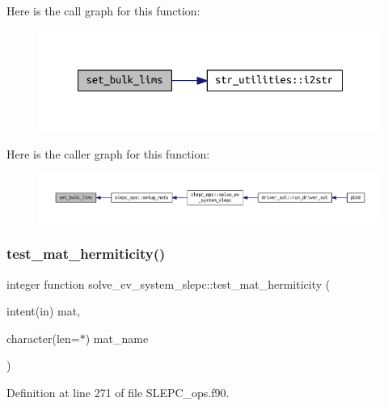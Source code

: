 Here is the call graph for this function\+:
\nopagebreak
\begin{figure}[H]
\begin{center}
\leavevmode
\includegraphics[width=348pt]{SLEPC__ops_8f90_aad0c37f65f398c2aa88ea11b21eb2006_cgraph}
\end{center}
\end{figure}
Here is the caller graph for this function\+:
\nopagebreak
\begin{figure}[H]
\begin{center}
\leavevmode
\includegraphics[width=350pt]{SLEPC__ops_8f90_aad0c37f65f398c2aa88ea11b21eb2006_icgraph}
\end{center}
\end{figure}
\mbox{\label{SLEPC__ops_8f90_a07b637672a3e89fa9562a693995f857d}} 
\subsubsection{\texorpdfstring{test\+\_\+mat\+\_\+hermiticity()}{test\_mat\_hermiticity()}}
{\footnotesize\ttfamily integer function solve\+\_\+ev\+\_\+system\+\_\+slepc\+::test\+\_\+mat\+\_\+hermiticity (\begin{DoxyParamCaption}\item[{intent(in)}]{mat,  }\item[{character(len=$\ast$)}]{mat\+\_\+name }\end{DoxyParamCaption})}



Definition at line 271 of file S\+L\+E\+P\+C\+\_\+ops.\+f90.

